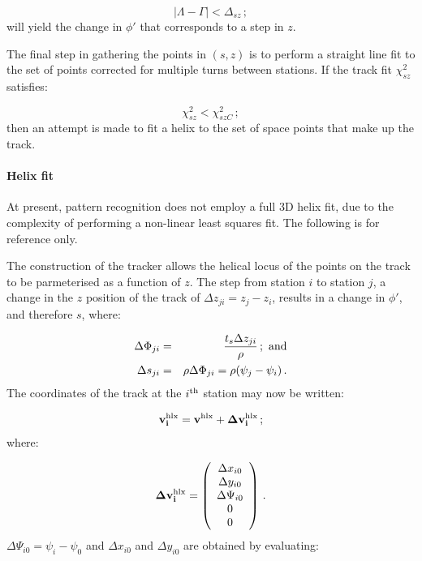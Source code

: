 \begin{equation}
  | \Lambda - \Gamma | < \Delta_{sz} \, ;
\end{equation} 
will yield the change in $\phi'$ that corresponds to a step in $z$. 

The final step in gathering the points in $(s, z)$ is to perform a straight line fit to the set of points corrected for multiple turns between stations.  If the track fit $\chi^2_{sz}$ satisfies: 

\begin{equation}
  \chi^2_{sz} < \chi^2_{szC} \, ;
\end{equation}
then an attempt is made to fit a helix to the set of space points that make up the track.

\paragraph{Helix fit}

At present, pattern recognition does not employ a full 3D helix fit, due to the complexity of performing a non-linear least squares fit.  The following is for reference only.

The construction of the tracker allows the helical locus of the points on the track to be parmeterised as a function of $z$. The step from station $i$ to station $j$, a change in the $z$ position of the track of $\Delta z_{ji} = z_j - z_i$, results in a change in $\phi'$, and therefore $s$, where:

\begin{eqnarray}
  \Delta \Phi_{ji} & = & \frac{t_s \Delta z_{ji}}{\rho} \, ; {\rm~and}  \\
  \Delta s_{ji}    & = & \rho \Delta \Phi_{ji} 
                    =    \rho (\psi_j - \psi_i) \, .
\end{eqnarray}
The coordinates of the track at the $i^{\rm th}$ station may now be written:

\begin{equation}
  {\bf v^{\rm hlx}_i} = {\bf v^{\rm hlx}} + {\bf \Delta v^{\rm hlx}_i} \, ;
\end{equation}
where:

\begin{equation}
  {\bf \Delta v^{\rm hlx}_i} =
    \left( 
      \begin{array}{c}
        \Delta x_{i0}    \\
        \Delta y_{i0}    \\
        \Delta \Psi_{i0} \\
        0                \\
        0
      \end{array}
    \right) \, .
\end{equation}
$\Delta \Psi_{i0} = \psi_i - \psi_0$ and $\Delta x_{i0}$ and $\Delta y_{i0}$ are obtained by evaluating:

